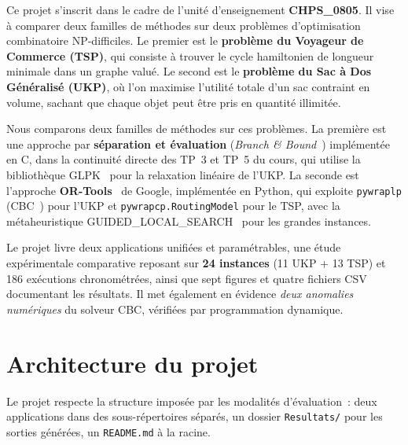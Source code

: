 \documentclass[11pt,a4paper]{article}
\begin{document}
Ce projet s'inscrit dans le cadre de l'unité d'enseignement \textbf{CHPS\_0805}. Il vise à comparer deux familles de méthodes sur deux problèmes d'optimisation combinatoire NP-difficiles. Le premier est le \textbf{problème du Voyageur de Commerce (TSP)}, qui consiste à trouver le cycle hamiltonien de longueur minimale dans un graphe valué. Le second est le \textbf{problème du Sac à Dos Généralisé (UKP)}, où l'on maximise l'utilité totale d'un sac contraint en volume, sachant que chaque objet peut être pris en quantité illimitée.

Nous comparons deux familles de méthodes sur ces problèmes. La première est une approche par \textbf{séparation et évaluation} (\textit{Branch \& Bound}~\cite{land-doig,kellerer-knapsack}) implémentée en C, dans la continuité directe des TP~3 et TP~5 du cours, qui utilise la bibliothèque GLPK~\cite{glpk} pour la relaxation linéaire de l'UKP. La seconde est l'approche \textbf{OR-Tools}~\cite{ortools} de Google, implémentée en Python, qui exploite \texttt{pywraplp} (CBC~\cite{cbc}) pour l'UKP et \texttt{pywrapcp.RoutingModel} pour le TSP, avec la métaheuristique GUIDED\_LOCAL\_SEARCH~\cite{voudouris-gls,lin-kernighan} pour les grandes instances.

Le projet livre deux applications unifiées et paramétrables, une étude expérimentale comparative reposant sur \textbf{24 instances} (11 UKP + 13 TSP) et 186 exécutions chronométrées, ainsi que sept figures et quatre fichiers CSV documentant les résultats. Il met également en évidence \emph{deux anomalies numériques} du solveur CBC, vérifiées par programmation dynamique.

\section{Architecture du projet}
\label{sec:archi}

Le projet respecte la structure imposée par les modalités d'évaluation~: deux applications dans des sous-répertoires séparés, un dossier \texttt{Resultats/} pour les sorties générées, un \texttt{README.md} à la racine.
\end{document}
